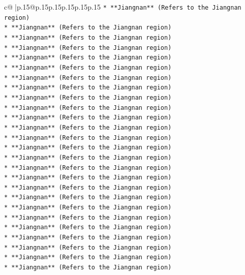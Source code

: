 \documentclass{article}
\begin{document}
{\begin{supertabular}{c@{$\;$}|p{.15\linewidth}@{}p{.15\linewidth}p{.15\linewidth}p{.15\linewidth}p{.15\linewidth}p{.15\linewidth}}
{{{\texttt{*   **Jiangnan** (Refers to the Jiangnan region)} \\
\texttt{*   **Jiangnan** (Refers to the Jiangnan region)} \\
\texttt{*   **Jiangnan** (Refers to the Jiangnan region)} \\
\texttt{*   **Jiangnan** (Refers to the Jiangnan region)} \\
\texttt{*   **Jiangnan** (Refers to the Jiangnan region)} \\
\texttt{*   **Jiangnan** (Refers to the Jiangnan region)} \\
\texttt{*   **Jiangnan** (Refers to the Jiangnan region)} \\
\texttt{*   **Jiangnan** (Refers to the Jiangnan region)} \\
\texttt{*   **Jiangnan** (Refers to the Jiangnan region)} \\
\texttt{*   **Jiangnan** (Refers to the Jiangnan region)} \\
\texttt{*   **Jiangnan** (Refers to the Jiangnan region)} \\
\texttt{*   **Jiangnan** (Refers to the Jiangnan region)} \\
\texttt{*   **Jiangnan** (Refers to the Jiangnan region)} \\
\texttt{*   **Jiangnan** (Refers to the Jiangnan region)} \\
\texttt{*   **Jiangnan** (Refers to the Jiangnan region)} \\
\texttt{*   **Jiangnan** (Refers to the Jiangnan region)} \\
\texttt{*   **Jiangnan** (Refers to the Jiangnan region)} \\
\texttt{*   **Jiangnan** (Refers to the Jiangnan region)} \\
\texttt{*   **Jiangnan** (Refers to the Jiangnan region)} \\
\texttt{*   **Jiangnan** (Refers to the Jiangnan region)} \\
\texttt{*   **Jiangnan** (Refers to the Jiangnan region)} \\
\texttt{*   **Jiangnan** (Refers to the Jiangnan region)} \\
\texttt{*   **Jiangnan** (Refers to the Jiangnan region)} \\
\texttt{*   **Jiangnan** (Refers to the Jiangnan region)} \\
\texttt{*   **Jiangnan** (Refers to the Jiangnan region)} \\
\texttt{*   **Jiangnan** (Refers to the Jiangnan region)} \\
}}}
\end{supertabular}}
\end{document}
